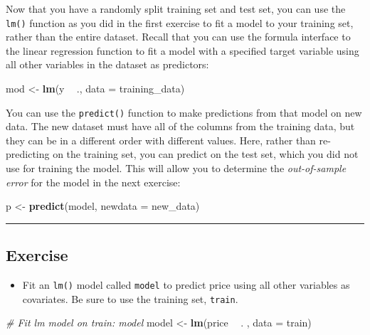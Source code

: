 \documentclass[
]{book}
\newenvironment{Shaded}{\begin{snugshade}}{\end{snugshade}}
\newcommand{\CommentTok}[1]{\textcolor[rgb]{0.56,0.35,0.01}{\textit{#1}}}
\newcommand{\DataTypeTok}[1]{\textcolor[rgb]{0.13,0.29,0.53}{#1}}
\newcommand{\KeywordTok}[1]{\textcolor[rgb]{0.13,0.29,0.53}{\textbf{#1}}}
\newcommand{\NormalTok}[1]{#1}
\newcommand{\OperatorTok}[1]{\textcolor[rgb]{0.81,0.36,0.00}{\textbf{#1}}}
\newcommand{\StringTok}[1]{\textcolor[rgb]{0.31,0.60,0.02}{#1}}
\providecommand{\tightlist}{%
  \setlength{\itemsep}{0pt}\setlength{\parskip}{0pt}}
\begin{document}
Now that you have a randomly split training set and test set, you can use the \texttt{lm()} function as you did in the first exercise to fit a model to your training set, rather than the entire dataset. Recall that you can use the formula interface to the linear regression function to fit a model with a specified target variable using all other variables in the dataset as predictors:

\begin{Shaded}
\begin{Highlighting}[]
\NormalTok{mod <-}\StringTok{ }\KeywordTok{lm}\NormalTok{(y }\OperatorTok{~}\StringTok{ }\NormalTok{., }\DataTypeTok{data =}\NormalTok{ training_data)}
\end{Highlighting}
\end{Shaded}

You can use the \texttt{predict()} function to make predictions from that model on new data. The new dataset must have all of the columns from the training data, but they can be in a different order with different values. Here, rather than re-predicting on the training set, you can predict on the test set, which you did not use for training the model. This will allow you to determine the \emph{out-of-sample error} for the model in the next exercise:

\begin{Shaded}
\begin{Highlighting}[]
\NormalTok{p <-}\StringTok{ }\KeywordTok{predict}\NormalTok{(model, }\DataTypeTok{newdata =}\NormalTok{ new_data)}
\end{Highlighting}
\end{Shaded}

\begin{center}\rule{0.5\linewidth}{0.5pt}\end{center}

\hypertarget{exercise-3}{%
\subsection*{Exercise}\label{exercise-3}}

\begin{itemize}
\tightlist
\item
  Fit an \texttt{lm()} model called \texttt{model} to predict price using all other variables as covariates. Be sure to use the training set, \texttt{train}.
\end{itemize}

\begin{Shaded}
\begin{Highlighting}[]
\CommentTok{# Fit lm model on train: model}
\NormalTok{model <-}\StringTok{ }\KeywordTok{lm}\NormalTok{(price }\OperatorTok{~}\StringTok{ }\NormalTok{. , }\DataTypeTok{data =}\NormalTok{ train)}
\end{Highlighting}
\end{Shaded}
\end{document}
